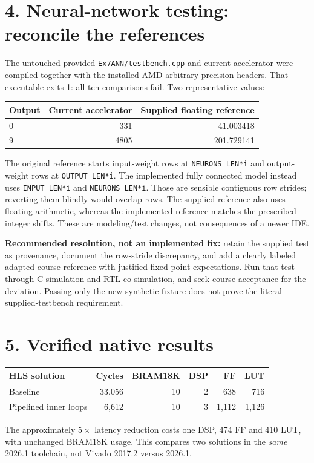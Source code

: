 \documentclass[11pt,a4paper]{article}
\begin{document}
\newpage
\section*{4. Neural-network testing: reconcile the references}
The untouched provided \texttt{Ex7ANN/testbench.cpp} and current accelerator
were compiled together with the installed AMD arbitrary-precision headers.
That executable exits 1: all ten comparisons fail. Two representative values:

\begin{center}
\begin{tabular}{lrr}
\toprule Output & Current accelerator & Supplied floating reference \\
\midrule
0 & 331 & 41.003418 \\
9 & 4805 & 201.729141 \\
\bottomrule
\end{tabular}
\end{center}

The original reference starts input-weight rows at \texttt{NEURONS\_LEN*i}
and output-weight rows at \texttt{OUTPUT\_LEN*i}. The implemented fully
connected model instead uses \texttt{INPUT\_LEN*i} and
\texttt{NEURONS\_LEN*i}. Those are sensible contiguous row strides; reverting
them blindly would overlap rows. The supplied reference also uses floating
arithmetic, whereas the implemented reference matches the prescribed integer
shifts. These are modeling/test changes, not consequences of a newer IDE.

\textbf{Recommended resolution, not an implemented fix:} retain the supplied
test as provenance, document the row-stride discrepancy, and add a clearly
labeled adapted course reference with justified fixed-point expectations.
Run that test through C simulation and RTL co-simulation, and seek course
acceptance for the deviation. Passing only the new synthetic fixture does not
prove the literal supplied-testbench requirement.

\section*{5. Verified native results}
\begin{center}
\begin{tabular}{lrrrrr}
\toprule HLS solution & Cycles & BRAM18K & DSP & FF & LUT \\
\midrule
Baseline & 33,056 & 10 & 2 & 638 & 716 \\
Pipelined inner loops & 6,612 & 10 & 3 & 1,112 & 1,126 \\
\bottomrule
\end{tabular}
\end{center}
The approximately $5\times$ latency reduction costs one DSP, 474 FF and
410 LUT, with unchanged BRAM18K usage. This compares two solutions in the
\emph{same} 2026.1 toolchain, not Vivado 2017.2 versus 2026.1.
\end{document}
